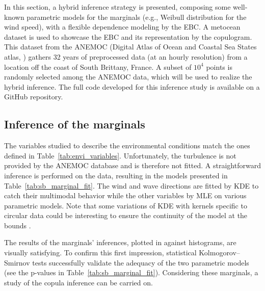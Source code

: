 In this section, a hybrid inference strategy is presented, composing some well-known parametric models for the marginals (e.g., Weibull distribution for the wind speed), with a flexible dependence modeling by the EBC. 
A metocean dataset is used to showcase the EBC and its representation by the copulogram. 
This dataset from the ANEMOC (Digital Atlas of Ocean and Coastal Sea States atlas, \citealp{raoult_2018_anemoc3}) gathers 32 years of preprocessed data 
(at an hourly resolution) from a location off the coast of South Brittany, France. 
A subset of $10^4$ points is randomly selected among the ANEMOC data, which will be used to realize the hybrid inference.
The full code developed for this inference study is available on a GitHub repository\footnotemark. 


\subsection{Inference of the marginals}\label{sec:marginal_inference}

The variables studied to describe the environmental conditions match the ones defined in Table~\ref{tab:envi_variables}. 
Unfortunately, the turbulence is not provided by the ANEMOC database and is therefore not fitted. 
A straightforward inference is performed on the data, resulting in the models presented in Table~\ref{tab:sb_marginal_fit}.
The wind and wave directions are fitted by KDE to catch their multimodal behavior while the other variables by MLE on various parametric models. 
Note that some variations of KDE with kernels specific to circular data could be interesting to ensure the continuity of the model at the bounds \citep{bai_1989_directional_kde}. 

The results of the marginals' inferences, plotted in  against histograms, are visually satisfying. 
To confirm this first impression, statistical Kolmogorov–Smirnov tests successfully validate the adequacy of the two parametric models (see the p-values in Table~\ref{tab:sb_marginal_fit}). 
Considering these marginals, a study of the copula inference can be carried on. 

